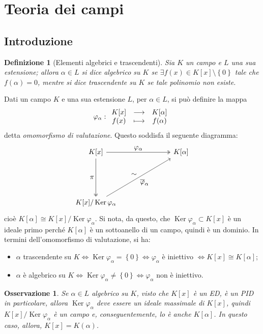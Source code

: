 \documentclass[12pt]{scrartcl}
\theoremstyle{style}
\newtheorem{definizione}{Definizione}[section]
\newtheorem{osservazione}{Osservazione}[section]
\numberwithin{equation}{subsection}
\begin{document}
\section{Teoria dei campi}
\subsection{Introduzione}
\begin{definizione}
	[Elementi algebrici e trascendenti]
	Sia $K$ un campo e $L$ una sua estensione; allora $\alpha  \in L$ si dice \textit{algebrico} su $K$ se $\exists f(x) \in K[x]\setminus\left\{ 0 \right\} $ tale che $f(\alpha ) = 0$, mentre si dice \textit{trascendente} su $K$ se tale polinomio non esiste.
\end{definizione}
\noindent Dati un campo $K$ e una sua estensione $L$, per $\alpha \in L$, si pu\`o definire la mappa
\[
	\varphi _\alpha :
\begin{array}
	{c c c}
	K[x] &\longrightarrow&K[\alpha ]\\
	f(x) &\longmapsto & f(\alpha )
\end{array}
\] 
detta \textit{omomorfismo di valutazione}.
Questo soddisfa il seguente diagramma:
\[
\begin{tikzcd}
	K[x] & & & K[\alpha ]\\
	\\
	\\
	K[x] / \operatorname{Ker} \varphi _\alpha 
	\arrow[from=1-1, to=1-4,"\displaystyle \varphi _\alpha ",two heads]
	\arrow[from=1-1, to=4-1,"\displaystyle \pi"',two heads]
	\arrow[from=4-1, to=1-4,"\displaystyle \overline{\varphi }_\alpha "',"\displaystyle \sim"]
\end{tikzcd}
\] 
cio\`e $K[\alpha ] \cong K[x] / \operatorname{Ker} \varphi _\alpha $.
Si nota, da questo, che $\operatorname{Ker} \varphi _\alpha \subset K[x]$ \`e un ideale primo perch\'e $K[\alpha ]$ \`e un sottoanello di un campo, quindi \`e un dominio.
In termini dell'omomorfismo di valutazione, si ha:
\begin{itemize}
	\item $\alpha $ trascendente su $K \iff \operatorname{Ker} \varphi _\alpha  = \left\{ 0 \right\} \iff\varphi _\alpha$ \`e iniettivo $\iff K[x] \cong K[\alpha ]$;
	\item $\alpha $ \`e algebrico su $K \iff \operatorname{Ker} \varphi _\alpha \neq \left\{ 0 \right\} \iff \varphi _\alpha $ non \`e iniettivo.
\end{itemize}
\begin{osservazione}
	Se $\alpha \in L$ algebrico su $K$, visto che $K[x]$ \`e un ED, \`e un PID in particolare, allora $\operatorname{Ker} \varphi _\alpha $ deve essere un ideale massimale di $K[x]$, quindi $K[x] / \operatorname{Ker} \varphi _\alpha $ \`e un campo e, conseguentemente, lo \`e anche $K[\alpha ]$.
	In questo caso, allora, $K[x] = K(\alpha )$.
\end{osservazione}
\end{document}
